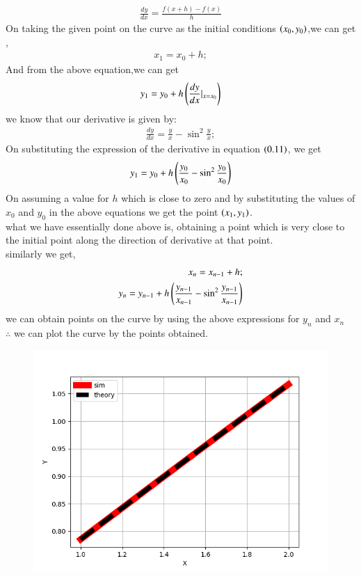 \documentclass[journal]{IEEEtran}
\begin{document}
\begin{align}
    \frac{dy}{dx}=\frac{f(x+h)-f(x)}{h}      
\end{align}
On taking the given point on the curve as the initial conditions $\left(x_0,y_0\right)$,we can get ,
\begin{align}
    x_1 = x_0 + h;
\end{align}
And from the above equation,we can get
\begin{align}
  y_1 = y_0 + h\left(\frac{dy}{dx}|_{x=x_0}\right)   
\end{align}
we know that our derivative is given by:\\
\begin{align}
    \frac{dy}{dx} = \frac{y}{x} - \sin^2{\frac{y}{x}};
\end{align}
On substituting the expression of the derivative in equation $\left(0.11\right)$, we get
\begin{align}
    y_1 = y_0 + h\left(\frac{y_0}{x_0} - \sin^2{\frac{y_0}{x_0}}\right) 
\end{align}
On assuming a value for $h$ which is close to zero  and by substituting the values of $x_0$ and $y_0$ in the above equations we get the point $\left(x_1,y_1\right)$. \\
what we have essentially done above is, obtaining a point which is very close to the initial point along the direction of derivative at that point.\\
similarly we get,
\begin{align}
    x_n = x_{n-1} + h ;\\
y_n = y_{n-1} + h\left(\frac{y_{n-1}}{x_{n-1}} - \sin^2{\frac{y_{n-1}}{x_{n-1}}}\right)
\end{align}
we can obtain points on the curve by using the above expressions for $y_n$ and $x_n$\\
 $\therefore$ we can plot the curve by the points obtained.
\begin{figure}[h!]
   \centering
   \includegraphics[width=0.75\columnwidth]{figures/Figure_1.png}
   \label{graph of the function}
\end{figure}
\end{document}

